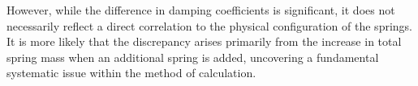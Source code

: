 \vspace{-3em}


\vspace{1em}

However, while the difference in damping coefficients is significant, it does not necessarily reflect a direct correlation to the physical configuration of the springs. It is more likely that the discrepancy arises primarily from the increase in total spring mass when an additional spring is added, uncovering a fundamental systematic issue within the method of calculation.
